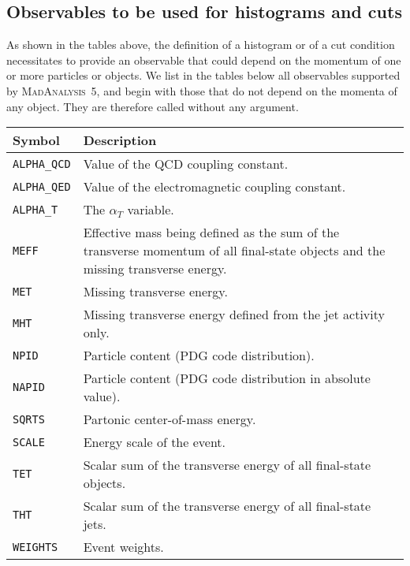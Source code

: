 \documentclass[a4paper]{article}
\newcommand{\MA}{\textsc{MadAnalysis}~5}
\begin{document}
\begin{shaded}
\section{\Large Observables to be used for histograms and cuts}
\end{shaded}


As shown in the tables above, the definition of a histogram or of a cut
condition necessitates to provide an observable that could depend on the momentum
of one or more particles or objects. We list in the tables below all observables
supported by \MA, and begin with those that do not depend on the momenta of any
object. They are therefore called without any argument.\\
\renewcommand{\arraystretch}{1.2}%
\begin{center}\begin{tabular}{l p{10.2cm}}
\hline
Symbol& Description\\
\hline
\color{ao} \verb?ALPHA_QCD? & Value of the QCD coupling constant.\\
\color{ao} \verb?ALPHA_QED? & Value of the electromagnetic coupling constant.\\
\color{ao} \verb?ALPHA_T?   & The $\alpha_T$ variable\cite{Randall:2008rw}.\\
\color{ao} \verb?MEFF?      & Effective mass being defined as the sum of the transverse
                   momentum of all final-state objects and the missing
                   transverse energy.\\
\color{ao} \verb?MET?       & Missing transverse energy.\\
\color{ao} \verb?MHT?       & Missing transverse energy defined from the jet activity
                   only.\\
\color{ao} \verb?NPID?      & Particle content (PDG code distribution).\\
\color{ao} \verb?NAPID?     & Particle content (PDG code distribution in
                   absolute value).\\
\color{ao} \verb?SQRTS?     & Partonic center-of-mass energy.\\
\color{ao} \verb?SCALE?     & Energy scale of the event.\\
\color{ao} \verb?TET?       & Scalar sum of the transverse energy of all final-state
                   objects.\\
\color{ao} \verb?THT?       & Scalar sum of the transverse energy of all final-state
                   jets.\\
\color{ao} \verb?WEIGHTS?   & Event weights.\\
\hline
\end{tabular}
\end{center}
\end{document}
